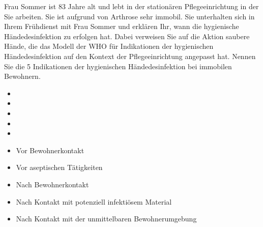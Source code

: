 \documentclass[a4paper]{scrartcl}
\begin{document}
\begin{aufgabe}{5}
	Frau Sommer ist 83 Jahre alt und lebt in der stationären Pflegeeinrichtung in der Sie arbeiten. Sie ist aufgrund von Arthrose sehr immobil. Sie unterhalten sich in Ihrem Frühdienst mit Frau Sommer und erklären Ihr, wann die hygienische Händedesinfektion zu erfolgen hat. Dabei verweisen Sie auf die Aktion saubere Hände, die das Modell der WHO für Indikationen der hygienischen Händedesinfektion auf den Kontext der Pflegeeinrichtung angepasst hat. Nennen Sie die 5 Indikationen der hygienischen Händedesinfektion bei immobilen Bewohnern.
	\begin{itemize}
		\item {}
		\item {}
		\item {}
		\item {}
		\item {}
	\end{itemize}
	
	\begin{loesung}
		\begin{itemize}
			\item Vor Bewohnerkontakt
			\item Vor aseptischen Tätigkeiten
			\item Nach Bewohnerkontakt
			\item Nach Kontakt mit potenziell infektiösem Material
			\item Nach Kontakt mit der unmittelbaren Bewohnerumgebung
		\end{itemize}
		
	\end{loesung}
\end{aufgabe}
\end{document}
